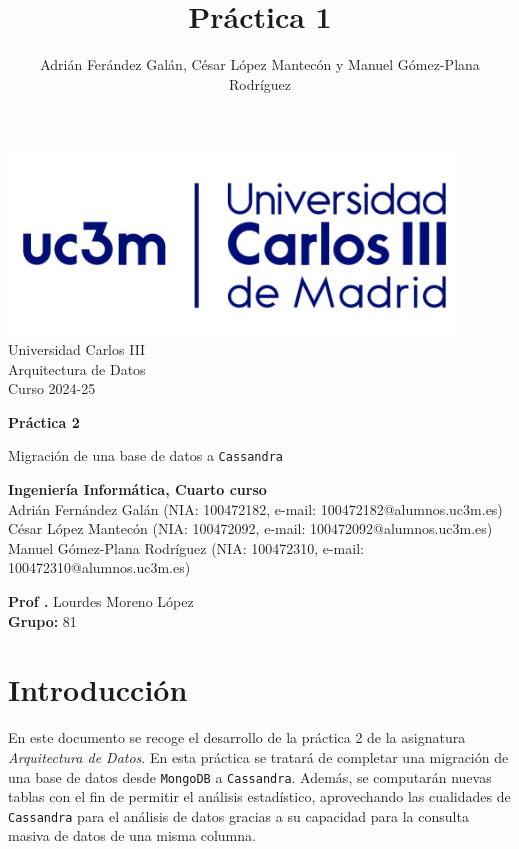 \documentclass[]{article}
\title{Práctica 1}
\author{Adrián Ferández Galán, César López Mantecón y Manuel Gómez-Plana Rodríguez}
\begin{document}
\begin{titlepage}
    \centering
   \includegraphics[width=0.9\textwidth]{uc3m.jpg} 
    {\Huge Universidad Carlos III\\
    
     \Large Arquitectura de Datos\\
     \vspace{0.5cm}
     Curso 2024-25}
    \vspace{2cm}

    {\Huge \textbf{Práctica 2} \par}
    \vspace{0.5cm}
    {\Large Migración de una base de datos a \texttt{Cassandra} \par}
    \vspace{8cm}

   \textbf{Ingeniería Informática, Cuarto curso}\\
    \vspace{0.2cm} 
    Adrián Fernández Galán       (NIA: 100472182, e-mail: 100472182@alumnos.uc3m.es)\\
    César López Mantecón         (NIA: 100472092, e-mail: 100472092@alumnos.uc3m.es)\\
    Manuel Gómez-Plana Rodríguez (NIA: 100472310, e-mail: 100472310@alumnos.uc3m.es)
    \vspace{0.5cm}

   
    \textbf{Prof .} Lourdes Moreno López\\
    
    \textbf{Grupo: } 81   
    
\end{titlepage}
\newpage

\renewcommand{\contentsname}{\centering Índice}

\hypersetup{linkcolor=black}
\tableofcontents
\hypersetup{linkcolor=blue}
\newpage

\section{Introducción}
\label{sec:introduccion}
En este documento se recoge el desarrollo de la práctica 2 de la asignatura
\textit{Arquitectura de Datos}. En esta práctica se tratará de completar una
migración de una base de datos desde \texttt{MongoDB} a \texttt{Cassandra}.
Además, se computarán nuevas tablas con el fin de permitir el análisis
estadístico, aprovechando las cualidades de \texttt{Cassandra} para el análisis
de datos gracias a su capacidad para la consulta masiva de datos de una misma
columna.
\end{document}

